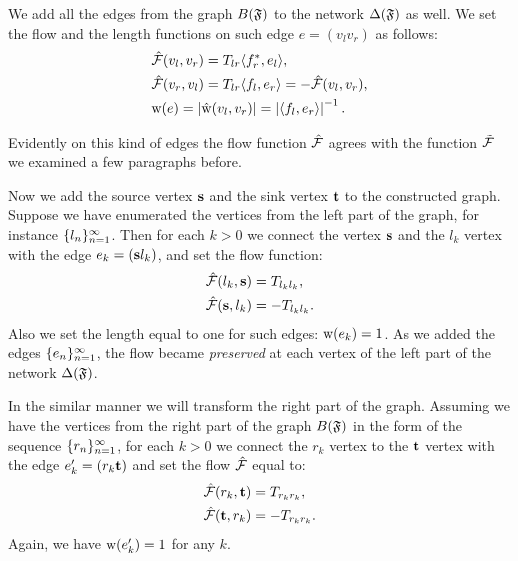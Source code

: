 \documentclass[12pt]{amsart}
\begin{document}
    We add all the edges from the graph $B(\mathfrak{F})$ to the network $\Delta(\mathfrak{F})$ as well.
    We set the flow and the length functions on such edge $e = (v_l v_r)$ as follows:
    \begin{align*}
      &\mathcal{\hat{F}}(v_l, v_r) = T_{lr} \langle f^*_r, e_l \rangle,\\
      &\mathcal{\hat{F}}(v_r, v_l) = T_{lr} \langle f_l, e_r \rangle = -\mathcal{\hat{F}}(v_l, v_r),\\
      &\mathrm{w}(e) = \left| \mathrm{\hat{w}}(v_l, v_r) \right| =  \left|\langle f_l, e_r \rangle\right|^{-1}.
    \end{align*}
    \begin{note}
      Evidently on this kind of edges the flow function $\mathcal{\hat{F}}$ agrees with the function $\mathcal{\tilde{F}}$
        we examined a few paragraphs before.
    \end{note}

    Now we add the source vertex $\mathbf{s}$ and the sink vertex $\mathbf{t}$ to the constructed graph.
    Suppose we have enumerated the vertices from the left part of the graph, for instance $\{{l}_n\}_{n=1}^\infty$.
    Then for each $k > 0$ we connect the vertex $\mathbf{s}$ and the $l_k$ vertex with
      the edge $e_k = (\mathbf{s} l_k)$, and set the flow function:
    \begin{align*}
      &\mathcal{\hat{F}}(l_k, \mathbf{s}) = T_{l_k l_k},\\
      &\mathcal{\hat{F}}(\mathbf{s}, l_k) = -T_{l_k l_k}.
    \end{align*}
    Also we set the length equal to one for such edges: $\mathrm{w}(e_k) = 1$.
    As we added the edges $\{{e}_n\}_{n=1}^\infty$, the flow became \emph{preserved} at each vertex of the left part of the network $\Delta(\mathfrak{F})$.

    In the similar manner we will transform the right part of the graph.
    Assuming we have the vertices from the right part of the graph $B(\mathfrak{F})$ in the form of the sequence $\{{r}_n\}_{n=1}^\infty$,
      for each $k > 0$ we connect the $r_k$ vertex to the $\mathbf{t}$ vertex with the edge $e'_k=(r_k \mathbf{t})$
      and set the flow $\mathcal{\hat{F}}$ equal to:
    \begin{align*}
      &\mathcal{\hat{F}}(r_k, \mathbf{t}) = T_{r_k r_k},\\
      &\mathcal{\hat{F}}(\mathbf{t}, r_k) = -T_{r_k r_k}.
    \end{align*}
    Again, we have $\mathrm{w}(e'_k) = 1$ for any $k$.
\end{document}
